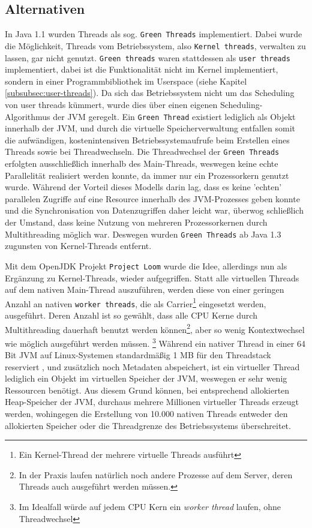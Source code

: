 \subsection{Alternativen}
\label{subsec:alternativen}
In Java 1.1 wurden Threads als sog. \verb|Green Threads| implementiert.
Dabei wurde die Möglichkeit, Threads vom Betriebssystem, also \verb|Kernel threads|,
verwalten zu lassen, gar nicht genutzt.
\verb|Green threads| waren stattdessen als \verb|user threads| implementiert,
dabei ist die Funktionalität
nicht im Kernel implementiert, sondern in einer Programmbibliothek im Userspace (siehe Kapitel \ref{subsubsec:user-threads}).
Da sich das Betriebssystem nicht um das Scheduling von user threads kümmert, wurde dies über einen eigenen
Scheduling-Algorithmus der JVM geregelt.\parencite{Oracle2010}
Ein \verb|Green Thread| existiert lediglich als Objekt innerhalb der JVM, und durch die virtuelle Speicherverwaltung entfallen
somit die aufwändigen, kostenintensiven Betriebssystemaufrufe beim
Erstellen eines Threads sowie bei Threadwechseln.
Die Threadwechsel der \verb|Green Threads| erfolgten ausschließlich innerhalb des Main-Threads, weswegen keine echte Parallelität
realisiert werden konnte, da immer nur ein Prozessorkern genutzt wurde.
Während der Vorteil dieses Modells darin lag, dass es keine 'echten' parallelen Zugriffe auf eine Resource innerhalb des JVM-Prozesses geben konnte
und die Synchronisation von Datenzugriffen daher leicht war, überwog schließlich der Umstand, dass keine Nutzung von mehreren Prozessorkernen
durch Multithreading möglich war. Deswegen wurden \verb|Green Threads| ab Java 1.3 zugunsten von Kernel-Threads entfernt.

Mit dem OpenJDK Projekt \verb|Project Loom| wurde die Idee, allerdings nun als Ergänzung zu Kernel-Threads,
wieder aufgegriffen.
Statt alle virtuellen Threads auf dem nativen Main-Thread auszuführen, werden diese von einer geringen Anzahl an
nativen \verb|worker threads|, die als Carrier\footnote{Ein Kernel-Thread der mehrere virtuelle Threads ausführt} eingesetzt werden, ausgeführt.
Deren Anzahl ist so gewählt, dass alle CPU Kerne durch Multithreading dauerhaft benutzt werden
können\footnote{In der Praxis laufen natürlich noch andere Prozesse auf dem Server, deren Threads auch ausgeführt werden müssen.},
aber so wenig Kontextwechsel wie möglich ausgeführt werden müssen.\parencite{Oracle2021}
\footnote{Im Idealfall würde auf jedem CPU Kern ein \textit{worker thread} laufen, ohne Threadwechsel}
Während ein nativer Thread in einer 64 Bit JVM auf Linux-Systemen standardmäßig 1 MB für den Threadstack reserviert
, und zusätzlich noch Metadaten abspeichert, ist ein virtueller Thread
lediglich ein Objekt im virtuellen Speicher der JVM, weswegen er sehr wenig Ressourcen benötigt.
Aus diesem Grund können, bei entsprechend allokierten Heap-Speicher der JVM, durchaus mehrere Millionen virtueller Threads erzeugt werden, wohingegen
die Erstellung von 10.000 nativen Threads entweder den allokierten Speicher oder die Threadgrenze
des Betriebssystems überschreitet.\newline

